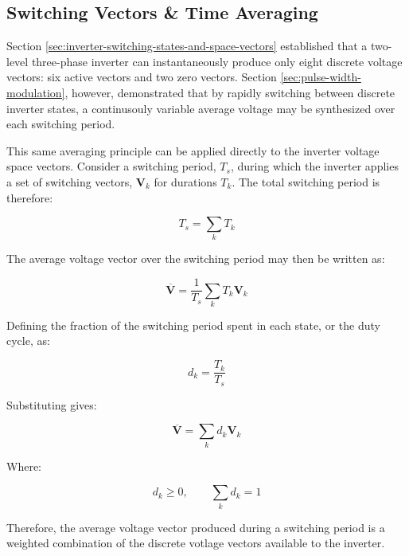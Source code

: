 \documentclass{article}
\begin{document}
\subsection{Switching Vectors \& Time Averaging}
\label{sec:switching-vectors-and-time-averaging}

Section \ref{sec:inverter-switching-states-and-space-vectors} established that a two-level three-phase inverter can instantaneously produce only eight discrete voltage vectors: six active vectors and two zero vectors. Section \ref{sec:pulse-width-modulation}, however, demonstrated that by rapidly switching between discrete inverter states, a continusouly variable average voltage may be synthesized over each switching period.

This same averaging principle can be applied directly to the inverter voltage space vectors. Consider a switching period, $T_s$, during which the inverter applies a set of switching vectors, $\mathbf{V}_k$ for durations $T_k$. The total switching period is therefore:

\begin{equation}
    T_s = \sum_k T_k
\end{equation}

The average voltage vector over the switching period may then be written as:

\begin{equation}
    \overline{\mathbf{V}} = \frac{1}{T_s} \sum_k T_k \mathbf{V}_k
\end{equation}

Defining the fraction of the switching period spent in each state, or the duty cycle, as:

\begin{equation}
    d_k = \frac{T_k}{T_s}
\end{equation}

Substituting gives:

\begin{equation}
    \overline{\mathbf{V}} = \sum_k d_k \mathbf{V}_k
\end{equation}

Where:

\begin{equation}
    d_k \geq 0, \qquad
    \sum_k d_k = 1
\end{equation}

Therefore, the average voltage vector produced during a switching period is a weighted combination of the discrete votlage vectors available to the inverter.
\end{document}
